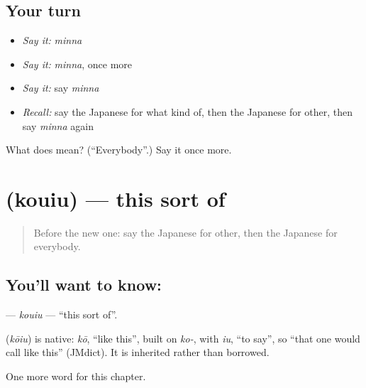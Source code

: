 \subsection*{Your turn}
\begin{itemize}
\raggedright
  \item \emph{Say it:} \emph{minna}
  \item \emph{Say it:} \emph{minna}, once more
  \item \emph{Say it:} say \emph{minna}
  \item \emph{Recall:} say the Japanese for what kind of, then the Japanese for other, then say \emph{minna} again
\end{itemize}

\begin{tcolorbox}[breakable,colback=teal!4,colframe=teal!35!black,title={Before you move on}]
What does  mean? (\textquotedblleft{}Everybody\textquotedblright{}.) Say it once more.
\end{tcolorbox}
\section[\texorpdfstring{\ja{こういう} (kouiu)}{こういう (kouiu)}]{ (kouiu) — this sort of}

\label{lesson:JA-C84-kouiu}



\begin{quote}
Before the new one: say the Japanese for other, then the Japanese for everybody.
\end{quote}

\subsection*{You'll want to know: }
\textbf{} — \emph{kouiu} — \textquotedblleft{}this sort of\textquotedblright{}.

\begin{cousinweb}
\textbf{} (\emph{kōiu}) is native: \emph{kō}, \textquotedblleft{}like this\textquotedblright{}, built on \emph{ko-}, with \emph{iu}, \textquotedblleft{}to say\textquotedblright{}, so \textquotedblleft{}that one would call like this\textquotedblright{} (JMdict). It is inherited rather than borrowed.
\end{cousinweb}

\begin{grammarlens}[title={What you've built}]
One more word for this chapter.
\end{grammarlens}

